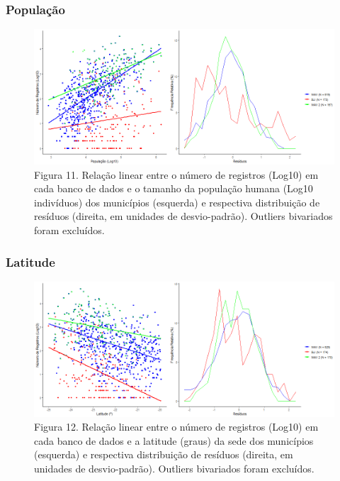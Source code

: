 \newpage



\subsubsection{População}

\begin{figure}[h!]
\centering
\includegraphics[width = 15cm]{Imagens/31333.png}
\\{\scriptsize Figura 11. Relação linear entre o número de registros (Log10) em cada banco de dados e o tamanho da população humana (Log10 indivíduos) dos municípios (esquerda) e respectiva distribuição de resíduos (direita, em unidades de desvio-padrão). Outliers bivariados foram excluídos.}
\end{figure}


\subsubsection{Latitude}

\begin{figure}[h!]
\centering
\includegraphics[width = 15cm]{Imagens/31433.png}
\\{\scriptsize Figura 12. Relação linear entre o número de registros (Log10) em cada banco de dados e a latitude (graus) da sede dos municípios (esquerda) e respectiva distribuição de resíduos (direita, em unidades de desvio-padrão). Outliers bivariados foram excluídos.}
\end{figure}

